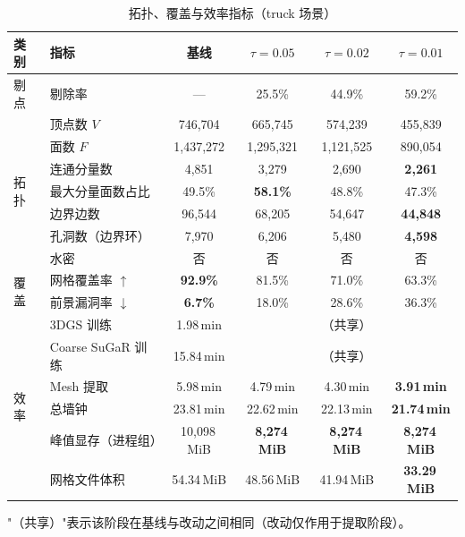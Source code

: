 \begin{table}[H]
\centering\footnotesize
\caption{拓扑、覆盖与效率指标（truck 场景）}
\label{tab:topo-cov-eff}
\begin{tabular}{llcccc}
\toprule
\textbf{类别} & \textbf{指标}
  & \textbf{基线} & $\tau{=}0.05$ & $\tau{=}0.02$ & $\tau{=}0.01$ \\
\midrule
剔点 & 剔除率               & ---       & 25.5\%    & 44.9\%    & 59.2\% \\
\midrule
\multirow{7}{*}{拓扑}
  & 顶点数 $V$           & 746{,}704
                                      & 665{,}745 & 574{,}239 & 455{,}839 \\
  & 面数 $F$             & 1{,}437{,}272
                                      & 1{,}295{,}321 & 1{,}121{,}525 & 890{,}054 \\
  & 连通分量数           & 4{,}851   & 3{,}279   & 2{,}690   & \textbf{2{,}261} \\
  & 最大分量面数占比     & 49.5\%    & \textbf{58.1\%}    & 48.8\%    & 47.3\% \\
  & 边界边数             & 96{,}544  & 68{,}205  & 54{,}647  & \textbf{44{,}848} \\
  & 孔洞数（边界环）     & 7{,}970   & 6{,}206   & 5{,}480   & \textbf{4{,}598} \\
  & 水密                 & 否         & 否         & 否         & 否 \\
\midrule
\multirow{2}{*}{覆盖}
  & 网格覆盖率 $\uparrow$    & \textbf{92.9\%} & 81.5\% & 71.0\% & 63.3\% \\
  & 前景漏洞率 $\downarrow$  & \textbf{6.7\%}  & 18.0\% & 28.6\% & 36.3\% \\
\midrule
\multirow{6}{*}{效率}
  & 3DGS 训练            & 1.98\,min
                                      & \multicolumn{3}{c}{（共享）} \\
  & Coarse SuGaR 训练    & 15.84\,min
                                      & \multicolumn{3}{c}{（共享）} \\
  & Mesh 提取            & 5.98\,min & 4.79\,min & 4.30\,min & \textbf{3.91\,min} \\
  & 总墙钟               & 23.81\,min & 22.62\,min & 22.13\,min & \textbf{21.74\,min} \\
  & 峰值显存（进程组）   & 10{,}098\,MiB
                                      & \textbf{8{,}274\,MiB} & \textbf{8{,}274\,MiB} & \textbf{8{,}274\,MiB} \\
  & 网格文件体积         & 54.34\,MiB
                                      & 48.56\,MiB & 41.94\,MiB & \textbf{33.29\,MiB} \\
\bottomrule
\end{tabular}
\begin{flushleft}
\footnotesize
"（共享）"表示该阶段在基线与改动之间相同（改动仅作用于提取阶段）。
\end{flushleft}
\end{table}

